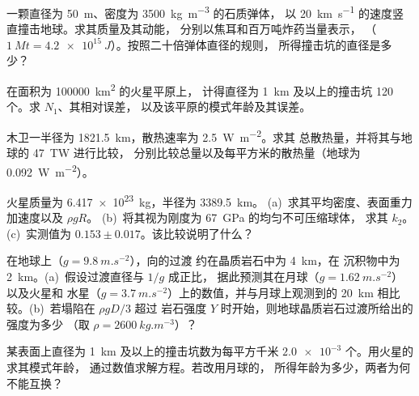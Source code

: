 \begin{exercise}[$\star$]\label{exo:b3:planetary-interiors-surfaces:2}
一颗直径为 \qty{50}{m}、密度为 \qty{3500}{kg.m^{-3}} 的石质弹体，
以 \qty{20}{km.s^{-1}} 的速度竖直撞击地球。求其质量及其动能，
分别以焦耳和百万吨炸药当量表示，
（$\qty{1}{Mt} = \qty{4.2e15}{J}$）。按照二十倍弹体直径的规则，
所得撞击坑的直径是多少？
\end{exercise}

\begin{exercise}[$\star$]\label{exo:b3:planetary-interiors-surfaces:3}
在面积为 \qty{100000}{km^2} 的火星平原上，
计得直径为 \qty{1}{km} 及以上的撞击坑 120 个。求 $N_1$、其相对误差，
以及该平原的模式年龄及其误差。
\end{exercise}

\begin{exercise}[$\star$]\label{exo:b3:planetary-interiors-surfaces:4}
木卫一半径为 \qty{1821.5}{km}，散热速率为 \qty{2.5}{W.m^{-2}}。求其
总散热量，并将其与地球的 \qty{47}{TW} 进行比较，
分别比较总量以及每平方米的散热量（地球为 \qty{0.092}{W.m^{-2}}）。
\end{exercise}

\begin{exercise}[$\star\star$]\label{exo:b3:planetary-interiors-surfaces:5}
火星质量为 \qty{6.417e23}{kg}，半径为 \qty{3389.5}{km}。
(a)~求其平均密度、表面重力加速度以及 $\rho gR$。
(b)~将其视为刚度为 \qty{67}{GPa} 的均匀不可压缩球体，
求其 $k_2$。
(c)~实测值为 $0.153 \pm 0.017$。该比较说明了什么？
\end{exercise}

\begin{exercise}[$\star\star$]\label{exo:b3:planetary-interiors-surfaces:6}
在地球上（$g = \qty{9.8}{m.s^{-2}}$），向的过渡
约在晶质岩石中为 \qty{4}{km}，在
沉积物中为 \qty{2}{km}。(a)~假设过渡直径与 $1/g$ 成正比，
据此预测其在月球（$g = \qty{1.62}{m.s^{-2}}$）以及火星和
水星（$g = \qty{3.7}{m.s^{-2}}$）上的数值，并与月球上观测到的 \qty{20}{km}
相比较。(b)~若塌陷在 $\rho gD/3$ 超过
岩石强度 $Y$ 时开始，则地球晶质岩石过渡所给出的强度为多少
（取 $\rho = \qty{2600}{kg.m^{-3}}$）？
\end{exercise}

\begin{exercise}[$\star\star$]\label{exo:b3:planetary-interiors-surfaces:7}
某表面上直径为 \qty{1}{km} 及以上的撞击坑数为每平方千米 $\num{2.0e-3}$
个。用火星的求其模式年龄，
通过数值求解方程。若改用月球的，
所得年龄为多少，两者为何不能互换？
\end{exercise}

